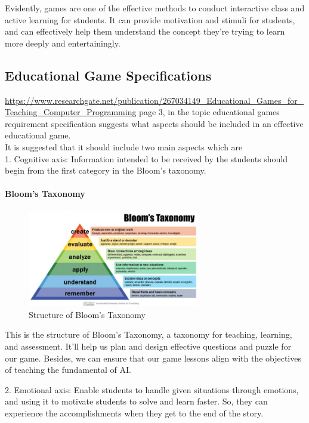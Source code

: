 Evidently, games are one of the effective methods to conduct interactive class and active learning for students. It can provide motivation and stimuli for students, and can effectively help them understand the concept they're trying to learn more deeply and entertainingly.


\subsection{Educational Game Specifications}
\url{https://www.researchgate.net/publication/267034149_Educational_Games_for_Teaching_Computer_Programming} page 3, in the topic educational games requirement specification suggests what aspects should be included in an effective educational game.\\
It is suggested that it should include two main aspects which are\\
1. Cognitive axis: Information intended to be received by the students should begin from the first category in the Bloom's taxonomy. 
\vspace{-5mm}
\paragraph{Bloom's Taxonomy} 

\begin{figure}
\includegraphics[width=7.5cm]{./assets/bloom.jpeg}
\caption{Structure of Bloom's Taxonomy}\label{fig:model3}
\end{figure} 
This is the structure of Bloom's Taxonomy, a taxonomy for teaching, learning, and assessment. It'll help us plan and design effective questions and puzzle for our game. Besides, we can ensure that our game lessons align with the objectives of teaching the fundamental of AI.
\\
\par
2. Emotional axis: Enable students to handle given situations through emotions, and using it to motivate students to solve and learn faster. So, they can experience the accomplishments when they get to the end of the story.
